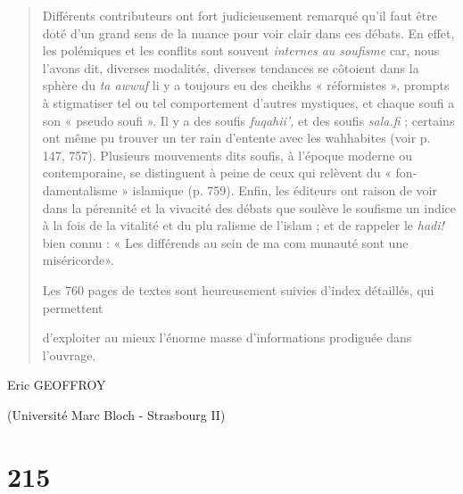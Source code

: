 \begin{quote}
Différents contributeurs ont fort judicieusement remarqué qu'il faut
être doté d'un grand sens de la nuance pour voir clair dans ces débats.
En effet, les polémiques et les conflits sont souvent \emph{internes au
soufisme} car, nous l'avons dit, diverses modalités, diverses tendances
se côtoient dans la sphère du \emph{ta awwuf} li y a toujours eu des
cheikhs « réformistes », prompts à stigmatiser tel ou tel comportement
d'autres mystiques, et chaque soufi a son « pseudo­ soufi ». Il y a des
soufis \emph{fuqahii',} et des soufis \emph{sala.fi} ; certains ont même
pu trouver un ter­ rain d'entente avec les wahhabites (voir p. 147,
757). Plusieurs mouvements dits soufis, à l'époque moderne ou
contemporaine, se distinguent à peine de ceux qui relèvent du « fon­
damentalisme » islamique (p. 759). Enfin, les éditeurs ont raison de
voir dans la pérennité et la vivacité des débats que soulève le soufisme
un indice à la fois de la vitalité et du plu­ ralisme de l'islam ; et de
rappeler le \emph{hadi!} bien connu : « Les différends au sein de ma
com­ munauté sont une miséricorde».

Les 760 pages de textes sont heureusement suivies d'index détaillés, qui
permettent

d'exploiter au mieux l'énorme masse d'informations prodiguée dans
l'ouvrage.
\end{quote}

Eric GEOFFROY

(Université Marc Bloch - Strasbourg II)

\hypertarget{section-1}{%
\section{215}\label{section-1}}
